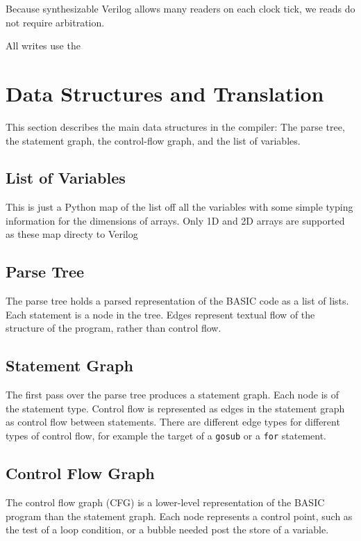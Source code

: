 \documentclass[10pt]{article}
\begin{document}
Because synthesizable Verilog allows many readers on each clock tick,
we reads do not require arbitration. 

All writes use the 

\section{Data Structures and Translation}


This section describes the main data structures in the compiler:
The parse tree, the statement graph, the control-flow graph, and
the list of variables.

\subsection{List of Variables}

This is just a Python map of the list off all the variables with some
simple typing information for the dimensions of arrays. Only 1D and 2D
arrays are supported as these map directy to Verilog

\subsection{Parse Tree}

The parse tree holds a parsed representation of the BASIC code as a list
of lists. Each statement is a node in the tree. Edges represent textual
flow of the structure of the program, rather than control flow. 

\subsection{Statement Graph} 

The first pass over the parse tree produces a statement graph. Each node is of the statement type. Control flow is represented as edges in the statement graph
as control flow between statements. There are different edge types for
different types of control flow, for example the target of a {\tt gosub}
or a {\tt for} statement. 

\subsection{Control Flow Graph}

The control flow graph (CFG) is a lower-level representation of the BASIC
program than the statement graph. Each node represents a control point,
such as the test of a loop condition, or a bubble needed post the store
of a variable. 




\end{document}
